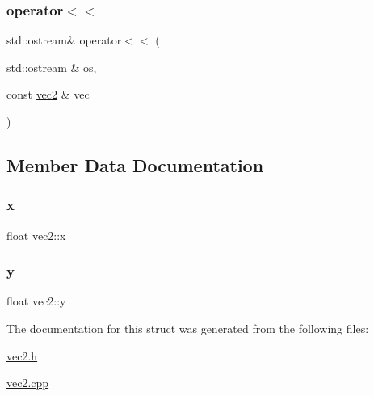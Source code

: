 \subsubsection{\texorpdfstring{operator$<$$<$}{operator<<}}
{\footnotesize\ttfamily std\+::ostream\& operator$<$$<$ (\begin{DoxyParamCaption}\item[{std\+::ostream \&}]{os,  }\item[{const \hyperlink{structvec2}{vec2} \&}]{vec }\end{DoxyParamCaption})\hspace{0.3cm}{\ttfamily [friend]}}



\subsection{Member Data Documentation}
\mbox{\label{structvec2_a002d3519d48fe3cd79729b5b0ded74bf}} 
\subsubsection{\texorpdfstring{x}{x}}
{\footnotesize\ttfamily float vec2\+::x}

\mbox{\label{structvec2_a6d28b12b511da692550fc9d37b4e9b1d}} 
\subsubsection{\texorpdfstring{y}{y}}
{\footnotesize\ttfamily float vec2\+::y}



The documentation for this struct was generated from the following files\+:\begin{DoxyCompactItemize}
\item 
\hyperlink{vec2_8h}{vec2.\+h}\item 
\hyperlink{vec2_8cpp}{vec2.\+cpp}\end{DoxyCompactItemize}
